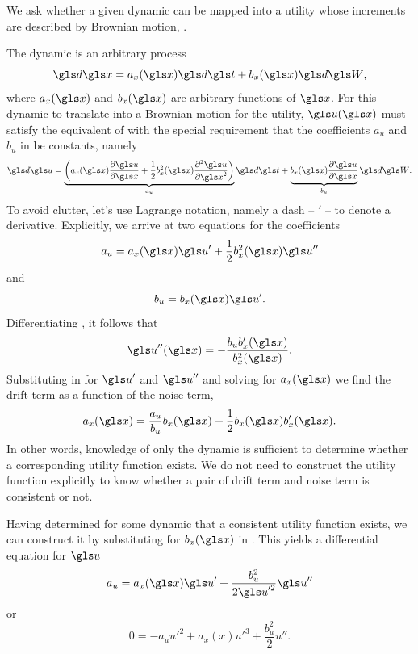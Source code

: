 We ask whether a given dynamic can be mapped into a utility whose
increments are described by Brownian motion, .

The dynamic is an arbitrary \Ito process
\begin{equation}
\gd\x=a_x(\x) \gd\t +b_x(\x) \gd\gW,
\elabel{dx_1}
\end{equation}
where $a_x(\x)$ and $b_x(\x)$ are arbitrary functions of $\x$. For 
this dynamic to translate into a Brownian motion for the utility, 
$\gu(\x)$ must satisfy the equivalent of  with the special
requirement that the coefficients $a_u$ and $b_u$ in  be constants, namely
\begin{equation}
\gd\gu = \underbrace{\left(a_x(\x) \frac{\partial \gu}{\partial \x} + \frac{1}{2}b_x^2(\x)\frac{\partial^2 \gu}{\partial \x^2}\right)}_{a_u}\gd\t + \underbrace{b_x(\x) \frac{\partial \gu}{\partial \x}}_{b_u} \gd\gW.
\elabel{du_2}
\end{equation}
To avoid clutter, let's use 
Lagrange notation, namely a dash  -- $'$ -- to denote a derivative. 
Explicitly, we arrive at two equations for the coefficients  
\begin{equation}
a_u=a_x(\x) \gu' + \frac{1}{2} b_x^2(\x) \gu''
\elabel{A}
\end{equation}
and
\begin{equation}
b_u=b_x(\x) \gu'.
\elabel{b_u}
\end{equation}
Differentiating , it follows that 
\begin{equation}
\gu''(\x)=-\frac{b_u b_x'(\x)}{b_x^2(\x)}.
\end{equation}
Substituting in  for $\gu'$ and $\gu''$ and solving for $a_x(\x)$ we
find the drift term as a function of the noise term,
\begin{equation}
a_x(\x) =\frac{a_u}{b_u}b_x(\x)+ \frac{1}{2}b_x(\x)b_x'(\x).
\elabel{consistency}
\end{equation}
In other words, knowledge of only the dynamic
is sufficient to determine whether a corresponding utility function exists.
We do not need to construct the utility function explicitly to know whether a pair 
of drift term and noise term is consistent or not. 

Having determined for some dynamic that a consistent utility function 
exists, we can construct it by substituting for $b_x(\x)$ in . 
This yields  a differential equation for $\gu$
\begin{equation}
a_u=a_x(\x) \gu' + \frac{b_u^2}{2\gu'^2}  \gu''
\end{equation}
or
\begin{equation}
0=-a_u u'^2+ a_x(x) u'^3 + \frac{b_u^2}{2}  u''.
\end{equation}

